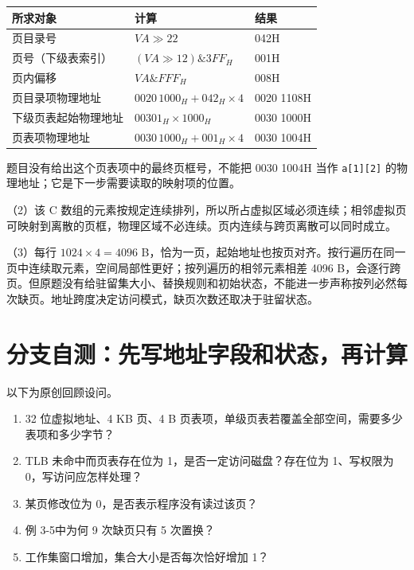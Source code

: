 \begin{wideblock}

\par\medskip\noindent\begin{minipage}{\linewidth}\fontsize{9.3}{12}\selectfont\begin{tabularx}{\linewidth}{@{}YYY@{}}
\toprule\noalign{}
所求对象 & 计算 & 结果 \\
\midrule\noalign{}


页目录号 & \(VA\gg22\) & 042H \\
页号（下级表索引） & \((VA\gg12)\mathbin{\&}3FF_H\) & 001H \\
页内偏移 & \(VA\mathbin{\&}FFF_H\) & 008H \\
页目录项物理地址 & \(0020\,1000_H+042_H\times4\) & 0020 1108H \\
下级页表起始物理地址 & \(00301_H\times1000_H\) & 0030 1000H \\
页表项物理地址 & \(0030\,1000_H+001_H\times4\) & 0030 1004H \\
\bottomrule\end{tabularx}
\end{minipage}\par\medskip

\end{wideblock}

题目没有给出这个页表项中的最终页框号，不能把 0030 1004H 当作 \texttt{a[\allowbreak{}1]\allowbreak{}[\allowbreak{}2]\allowbreak{}} 的物理地址；它是下一步需要读取的映射项的位置。

（2）该 C 数组的元素按规定连续排列，所以所占虚拟区域必须连续；相邻虚拟页可映射到离散的页框，物理区域不必连续。页内连续与跨页离散可以同时成立。

（3）每行 \(1024\times4=4096\) B，恰为一页，起始地址也按页对齐。按行遍历在同一页中连续取元素，空间局部性更好；按列遍历的相邻元素相差 4096 B，会逐行跨页。但原题没有给驻留集大小、替换规则和初始状态，不能进一步声称按列必然每次缺页。地址跨度决定访问模式，缺页次数还取决于驻留状态。

\section{分支自测：先写地址字段和状态，再计算}\label{OS03-5-review}

以下为原创回顾设问。

\begin{enumerate}
\def\labelenumi{\arabic{enumi}.}
\tightlist
\item
  32 位虚拟地址、4 KB 页、4 B 页表项，单级页表若覆盖全部空间，需要多少表项和多少字节？
\item
  TLB 未命中而页表存在位为 1，是否一定访问磁盘？存在位为 1、写权限为 0，写访问应怎样处理？
\item
  某页修改位为 0，是否表示程序没有读过该页？
\item
  例 3-5中为何 9 次缺页只有 5 次置换？
\item
  工作集窗口增加，集合大小是否每次恰好增加 1？
\end{enumerate}

